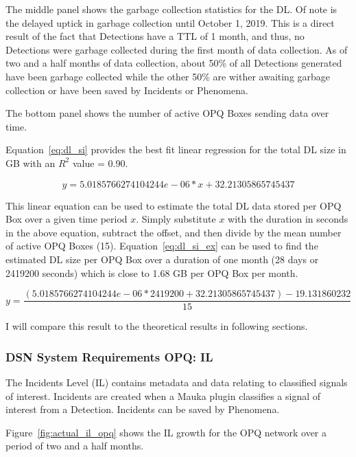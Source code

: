 The middle panel shows the garbage collection statistics for the DL. Of note is the delayed uptick in garbage collection until October 1, 2019. This is a direct result of the fact that Detections have a TTL of 1 month, and thus, no Detections were garbage collected during the first month of data collection. As of two and a half months of data collection, about 50\% of all Detections generated have been garbage collected while the other 50\% are wither awaiting garbage collection or have been saved by Incidents or Phenomena.

The bottom panel shows the number of active OPQ Boxes sending data over time.

Equation~\ref{eq:dl_si} provides the best fit linear regression for the total DL size in GB with an $R^2$ value = 0.90.

\begin{equation}
    y = 5.0185766274104244e-06 * x + 32.21305865745437
    \label{eq:dl_si}
\end{equation}

This linear equation can be used to estimate the total DL data stored per OPQ Box over a given time period $x$. Simply substitute $x$ with the duration in seconds in the above equation, subtract the offset, and then divide by the mean number of active OPQ Boxes (15). Equation~\ref{eq:dl_si_ex} can be used to find the estimated DL size per OPQ Box over a duration of one month (28 days or 2419200 seconds) which is close to 1.68 GB per OPQ Box per month.

\begin{equation}
    y = \frac{(5.0185766274104244e-06 * 2419200 + 32.21305865745437) - 19.131860232}{15}
    \label{eq:dl_si_ex}
\end{equation}

I will compare this result to the theoretical results in following sections.

\subsubsection{DSN System Requirements OPQ: IL}

The Incidents Level (IL) contains metadata and data relating to classified signals of interest. Incidents are created when a Mauka plugin classifies a signal of interest from a Detection. Incidents can be saved by Phenomena.

Figure~\ref{fig:actual_il_opq} shows the IL growth for the OPQ network over a period of two and a half months.

